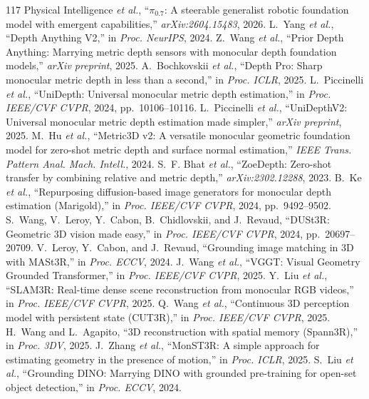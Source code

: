 \documentclass[10pt,journal]{IEEEtran}
\begin{document}
{\begin{thebibliography}{117}
 Physical Intelligence \emph{et al.}, ``$\pi_{0.7}$: A steerable generalist robotic foundation model with emergent capabilities,'' \emph{arXiv:2604.15483}, 2026.
 L.~Yang \emph{et al.}, ``Depth Anything V2,'' in \emph{Proc. NeurIPS}, 2024.
 Z.~Wang \emph{et al.}, ``Prior Depth Anything: Marrying metric depth sensors with monocular depth foundation models,'' \emph{arXiv preprint}, 2025.
 A.~Bochkovskii \emph{et al.}, ``Depth Pro: Sharp monocular metric depth in less than a second,'' in \emph{Proc. ICLR}, 2025.
 L.~Piccinelli \emph{et al.}, ``UniDepth: Universal monocular metric depth estimation,'' in \emph{Proc. IEEE/CVF CVPR}, 2024, pp.~10106--10116.
 L.~Piccinelli \emph{et al.}, ``UniDepthV2: Universal monocular metric depth estimation made simpler,'' \emph{arXiv preprint}, 2025.
 M.~Hu \emph{et al.}, ``Metric3D v2: A versatile monocular geometric foundation model for zero-shot metric depth and surface normal estimation,'' \emph{IEEE Trans. Pattern Anal. Mach. Intell.}, 2024.
 S.~F. Bhat \emph{et al.}, ``ZoeDepth: Zero-shot transfer by combining relative and metric depth,'' \emph{arXiv:2302.12288}, 2023.
 B.~Ke \emph{et al.}, ``Repurposing diffusion-based image generators for monocular depth estimation (Marigold),'' in \emph{Proc. IEEE/CVF CVPR}, 2024, pp.~9492--9502.
 S.~Wang, V.~Leroy, Y.~Cabon, B.~Chidlovskii, and J.~Revaud, ``DUSt3R: Geometric 3D vision made easy,'' in \emph{Proc. IEEE/CVF CVPR}, 2024, pp.~20697--20709.
 V.~Leroy, Y.~Cabon, and J.~Revaud, ``Grounding image matching in 3D with MASt3R,'' in \emph{Proc. ECCV}, 2024.
 J.~Wang \emph{et al.}, ``VGGT: Visual Geometry Grounded Transformer,'' in \emph{Proc. IEEE/CVF CVPR}, 2025.
 Y.~Liu \emph{et al.}, ``SLAM3R: Real-time dense scene reconstruction from monocular RGB videos,'' in \emph{Proc. IEEE/CVF CVPR}, 2025.
 Q.~Wang \emph{et al.}, ``Continuous 3D perception model with persistent state (CUT3R),'' in \emph{Proc. IEEE/CVF CVPR}, 2025.
 H.~Wang and L.~Agapito, ``3D reconstruction with spatial memory (Spann3R),'' in \emph{Proc. 3DV}, 2025.
 J.~Zhang \emph{et al.}, ``MonST3R: A simple approach for estimating geometry in the presence of motion,'' in \emph{Proc. ICLR}, 2025.
 S.~Liu \emph{et al.}, ``Grounding DINO: Marrying DINO with grounded pre-training for open-set object detection,'' in \emph{Proc. ECCV}, 2024.

\end{thebibliography}}
\end{document}

